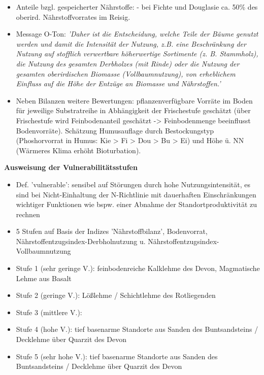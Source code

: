 \documentclass{article}
\begin{document}
\begin{itemize}
	\item Anteile bzgl. gespeicherter Nährstoffe: - bei Fichte und Douglasie ca. 50\% des oberird. Nährstoffvorrates im Reisig.
	
	
	\item Message O-Ton: \textit{'Daher ist die Entscheidung, welche Teile der 	Bäume genutzt werden und damit die Intensität der Nutzung, z.B. eine Beschränkung der Nutzung auf stofflich verwertbare höherwertige Sortimente (z. B. Stammholz), die Nutzung des gesamten Derbholzes (mit Rinde) oder die Nutzung der gesamten oberirdischen Biomasse (Vollbaumnutzung), von erheblichem Einfluss auf die Höhe der Entzüge an Biomasse und Nährstoffen.'}  
	
	\item Neben Bilanzen weitere Bewertungen: pflanzenverfügbare Vorräte im Boden für jeweilige Substratreihe in Abhängigkeit der Frischestufe geschätzt (über Frischestufe wird Feinbodenanteil geschätzt -> Feinbodenmenge beeinflusst Bodenvorräte). Schätzung Humusauflage durch Bestockungstyp (Phoshorvorrat in Humus: Kie > Fi > Dou > Bu > Ei) und Höhe ü. NN (Wärmeres Klima erhöht Bioturbation).

\end{itemize} 

\textbf{Ausweisung der Vulnerabilitätsstufen}\\

\begin{itemize}
	
	\item Def. 'vulnerable': sensibel auf Störungen durch hohe Nutzungsintensität, es sind bei Nicht-Einhaltung der N-Richtlinie mit dauerhaften Einschränkungen wichtiger Funktionen wie bspw. einer Abnahme der Standortproduktivität zu rechnen
	
	\item 5 Stufen auf Basis der Indizes 'Nährstoffbilanz', Bodenvorrat, Nährstoffentzugsindex-Derbholnutzung u. Nährstoffentzugsindex-Vollbaumnutzung
	
	\item Stufe 1 (sehr geringe V.): feinbodenreiche Kalklehme des Devon, Magmatische Lehme aus Basalt
	
	\item Stufe 2 (geringe V.): Lößlehme / Schichtlehme des Rotliegenden
	
	\item Stufe 3 (mittlere V.): 
	
	\item Stufe 4 (hohe V.): tief basenarme Standorte aus Sanden des Buntsandsteins / Decklehme über Quarzit des Devon
	
	\item Stufe 5 (sehr hohe V.): tief basenarme Standorte aus Sanden des Buntsandsteins / Decklehme über Quarzit des Devon

\end{itemize} 
\end{document}
